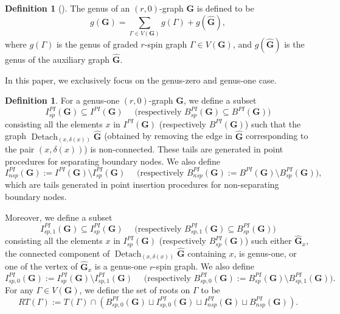 \documentclass[11pt]{amsart}
\theoremstyle{definition}
\newtheorem{dfn}[dummy]{Definition}
\theoremstyle{remark}
\newcommand{\<}{\left<}
\renewcommand{\>}{\right>}
\numberwithin{equation}{section}
\begin{document}
\begin{dfn}[{\cite[Definition 4.7]{TZ1}}]
The genus of an $(r,0)$-graph $\mathbf{G}$ is defined to be 
$$
g(\mathbf{G})=\sum_{\Gamma\in V(\bm{G})}g(\Gamma)+g(\hat{\mathbf{G}}),
$$
where $g(\Gamma)$ is the genus of graded $r$-spin graph $\Gamma\in V(\bm{G})$, and $g(\hat{\mathbf{G}})$ is the genus of the auxiliary graph $\hat{\mathbf{G}}$.

\end{dfn}

In this paper, we exclusively focus on the genus-zero and genus-one case.



\begin{dfn}
For a genus-one $(r,0)$-graph $\mathbf{G}$, we define a subset
$$I^{PI}_{sp}(\mathbf{G})\subseteq I^{PI}(\mathbf{G}) \quad\text{  (respectively } B^{PI}_{sp}(\mathbf{G})\subseteq B^{PI}(\mathbf{G})\text{)}$$ consisting all the elements $x$ in $I^{PI}(\mathbf{G})$ (respectively $B^{PI}(\mathbf{G})$) such that the graph $\operatorname{Detach}_{(x,\delta(x))}\hat{\mathbf{G}}$ (obtained by removing the edge in $\hat{\mathbf{G}}$ corresponding to the pair $(x,\delta(x))$) is non-connected. These tails are generated in point procedures for separating boundary nodes. 
We also define 
$$I^{PI}_{nsp}(\mathbf{G}):=I^{PI}(\mathbf{G})\setminus I^{PI}_{sp}(\mathbf{G}) \quad \text{  (respectively } B^{PI}_{nsp}(\mathbf{G}):=B^{PI}(\mathbf{G})\setminus B^{PI}_{sp}(\mathbf{G})\text{)},$$
which are tails generated in point insertion procedures for non-separating boundary nodes.

Moreover, we define a subset
$$I^{PI}_{sp,1}(\mathbf{G})\subseteq I^{PI}_{sp}(\mathbf{G}) \quad\text{  (respectively } B^{PI}_{sp,1}(\mathbf{G})\subseteq B^{PI}_{sp}(\mathbf{G})\text{)}$$ consisting all the elements $x$ in $I^{PI}_{sp}(\mathbf{G})$ (respectively $B^{PI}_{sp}(\mathbf{G})$) such either $\hat{\mathbf{G}}_{x}$, the connected component of $\operatorname{Detach}_{(x,\delta(x))}\hat{\mathbf{G}}$ containing $x$, is genus-one, or one of  the vertex of $\hat{\mathbf{G}}_{x}$ is a genus-one $r$-spin graph. We also define
$$I^{PI}_{sp,0}(\mathbf{G}):=I^{PI}_{sp}(\mathbf{G})\setminus I^{PI}_{sp,1}(\mathbf{G}) \quad \text{  (respectively } B^{PI}_{sp,0}(\mathbf{G}):=B^{PI}_{sp}(\mathbf{G})\setminus B^{PI}_{sp,1}(\mathbf{G})\text{)}.$$
For any $\Gamma\in V(\bm{G})$, we define the set of roots on $\Gamma$ to be
\begin{equation}\label{eq root for vertices of PI graph}
RT(\Gamma):=T(\Gamma)\cap(B^{PI}_{sp,0}(\mathbf{G})\sqcup I^{PI}_{sp,0}(\mathbf{G})\sqcup I^{PI}_{nsp}(\mathbf{G})\sqcup B^{PI}_{nsp}(\mathbf{G})).
\end{equation}
\end{dfn}
\end{document}
